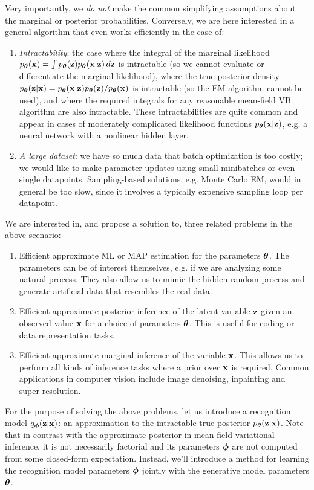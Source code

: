 \documentclass{article} %
\theoremstyle{definition}
\begin{document}
Very importantly, we \emph{do not} make the common simplifying assumptions about the marginal or posterior probabilities. Conversely, we are here interested in a general algorithm that even works efficiently in the case of:
\begin{enumerate}
\item \emph{Intractability}: the case where the integral of the marginal likelihood $p_{\boldsymbol{\theta}}(\mathbf{x}) = \int p_{\boldsymbol{\theta}}(\mathbf{z}) p_{\boldsymbol{\theta}}(\mathbf{x}|\mathbf{z}) \,d\mathbf{z}$ is intractable (so we cannot evaluate or differentiate the marginal likelihood), where the true posterior density $p_{\boldsymbol{\theta}}(\mathbf{z}|\mathbf{x}) = p_{\boldsymbol{\theta}}(\mathbf{x}|\mathbf{z})p_{\boldsymbol{\theta}}(\mathbf{z})/p_{\boldsymbol{\theta}}(\mathbf{x})$ is intractable (so the EM algorithm cannot be used), and where the required integrals for any reasonable mean-field VB algorithm are also intractable. These intractabilities are quite common and appear in cases of moderately complicated likelihood functions $p_{\boldsymbol{\theta}}(\mathbf{x}|\mathbf{z})$, e.g. a neural network with a nonlinear hidden layer.
\item \emph{A large dataset}: we have so much data that batch optimization is too costly; we would like to make parameter updates using small minibatches or even single datapoints. Sampling-based solutions, e.g. Monte Carlo EM, would in general be too slow, since it involves a typically expensive sampling loop per datapoint.
\end{enumerate}

We are interested in, and propose a solution to, three related problems in the above scenario:
\begin{enumerate}
\item Efficient approximate ML or MAP estimation for the parameters $\boldsymbol{\theta}$. The parameters can be of interest themselves, e.g. if we are analyzing some natural process. They also allow us to mimic the hidden random process and generate artificial data that resembles the real data.
\item Efficient approximate posterior inference of the latent variable $\mathbf{z}$ given an observed value $\mathbf{x}$ for a choice of parameters $\boldsymbol{\theta}$. This is useful for coding or data representation tasks.
\item Efficient approximate marginal inference of the variable $\mathbf{x}$. This allows us to perform all kinds of inference tasks where a prior over $\mathbf{x}$ is required. Common applications in computer vision include image denoising, inpainting and super-resolution.
\end{enumerate}

For the purpose of solving the above problems, let us introduce a recognition model $q_{\boldsymbol{\phi}}(\mathbf{z}|\mathbf{x})$: an approximation to the intractable true posterior $p_{\boldsymbol{\theta}}(\mathbf{z}|\mathbf{x})$. Note that in contrast with the approximate posterior in mean-field variational inference, it is not necessarily factorial and its parameters $\boldsymbol{\phi}$ are not computed from some closed-form expectation. Instead, we'll introduce a method for learning the recognition model parameters $\boldsymbol{\phi}$ jointly with the generative model parameters $\boldsymbol{\theta}$.
\end{document}
